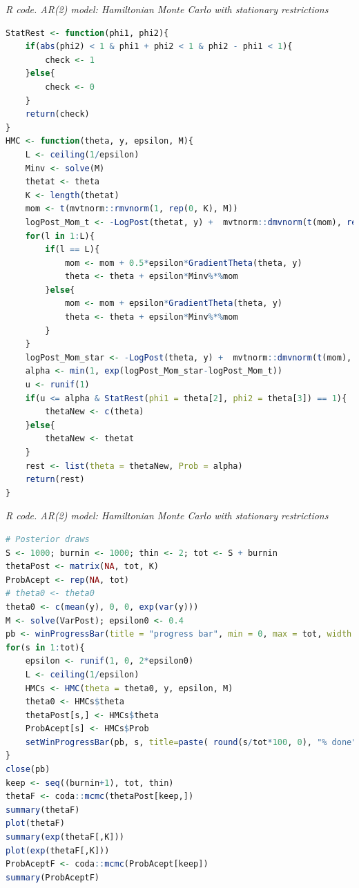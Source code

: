 \begin{enumerate}[leftmargin=*]
\begin{tcolorbox}[enhanced,width=4.67in,center upper,
	fontupper=\large\bfseries,drop shadow southwest,sharp corners]
	\textit{R code. AR(2) model:  Hamiltonian Monte Carlo with stationary restrictions}
	\begin{VF}
		\begin{lstlisting}[language=R]
StatRest <- function(phi1, phi2){
	if(abs(phi2) < 1 & phi1 + phi2 < 1 & phi2 - phi1 < 1){
		check <- 1
	}else{
		check <- 0
	}
	return(check)
}
HMC <- function(theta, y, epsilon, M){
	L <- ceiling(1/epsilon)
	Minv <- solve(M)
	thetat <- theta
	K <- length(thetat)
	mom <- t(mvtnorm::rmvnorm(1, rep(0, K), M))
	logPost_Mom_t <- -LogPost(thetat, y) +  mvtnorm::dmvnorm(t(mom), rep(0, K), M, log = TRUE)  
	for(l in 1:L){
		if(l == L){
			mom <- mom + 0.5*epsilon*GradientTheta(theta, y)
			theta <- theta + epsilon*Minv%*%mom
		}else{
			mom <- mom + epsilon*GradientTheta(theta, y)
			theta <- theta + epsilon*Minv%*%mom
		}
	}
	logPost_Mom_star <- -LogPost(theta, y) +  mvtnorm::dmvnorm(t(mom), rep(0, K), M, log = TRUE)  
	alpha <- min(1, exp(logPost_Mom_star-logPost_Mom_t))
	u <- runif(1)
	if(u <= alpha & StatRest(phi1 = theta[2], phi2 = theta[3]) == 1){
		thetaNew <- c(theta)
	}else{
		thetaNew <- thetat
	}
	rest <- list(theta = thetaNew, Prob = alpha)
	return(rest)
}
\end{lstlisting}
	\end{VF}
\end{tcolorbox}     


\begin{tcolorbox}[enhanced,width=4.67in,center upper,
	fontupper=\large\bfseries,drop shadow southwest,sharp corners]
	\textit{R code. AR(2) model:  Hamiltonian Monte Carlo with stationary restrictions}
	\begin{VF}
		\begin{lstlisting}[language=R]
# Posterior draws
S <- 1000; burnin <- 1000; thin <- 2; tot <- S + burnin
thetaPost <- matrix(NA, tot, K)
ProbAcept <- rep(NA, tot)
# theta0 <- theta0
theta0 <- c(mean(y), 0, 0, exp(var(y)))  
M <- solve(VarPost); epsilon0 <- 0.4
pb <- winProgressBar(title = "progress bar", min = 0, max = tot, width = 300)
for(s in 1:tot){
	epsilon <- runif(1, 0, 2*epsilon0)
	L <- ceiling(1/epsilon)
	HMCs <- HMC(theta = theta0, y, epsilon, M) 
	theta0 <- HMCs$theta 
	thetaPost[s,] <- HMCs$theta
	ProbAcept[s] <- HMCs$Prob
	setWinProgressBar(pb, s, title=paste( round(s/tot*100, 0), "% done"))
}
close(pb)
keep <- seq((burnin+1), tot, thin)
thetaF <- coda::mcmc(thetaPost[keep,])
summary(thetaF)
plot(thetaF)
summary(exp(thetaF[,K]))
plot(exp(thetaF[,K]))
ProbAceptF <- coda::mcmc(ProbAcept[keep])
summary(ProbAceptF)
\end{lstlisting}
	\end{VF}
\end{tcolorbox}  


\end{enumerate}
